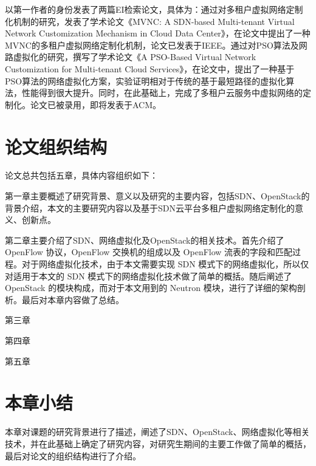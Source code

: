 以第一作者的身份发表了两篇EI检索论文，具体为：通过对多租户虚拟网络定制化机制的研究，发表了学术论文《MVNC: A SDN-based Multi-tenant Virtual Network Customization Mechanism in Cloud Data Center》，在论文中提出了一种MVNC的多租户虚拟网络定制化机制，论文已发表于IEEE。通过对\gls*{PSO}算法及网路虚拟化的研究，撰写了学术论文《A PSO-Based Virtual Network Customization for Multi-tenant Cloud Services》，在论文中，提出了一种基于PSO算法的网络虚拟化方案，实验证明相对于传统的基于最短路径的虚拟化算法，性能得到很大提升。同时，在此基础上，完成了多租户云服务中虚拟网络的定制化。论文已被录用，即将发表于ACM。
\section{论文组织结构}
论文总共包括五章，具体内容组织如下：

第一章主要概述了研究背景、意义以及研究的主要内容，包括SDN、OpenStack的背景介绍，本文的主要研究内容以及基于SDN云平台多租户虚拟网络定制化的意义、创新点。

第二章主要介绍了SDN、网络虚拟化及OpenStack的相关技术。首先介绍了OpenFlow 协议，OpenFlow 交换机的组成以及 OpenFlow 流表的字段和匹配过程。对于网络虚拟化技术，由于本文需要实现 SDN 模式下的网络虚拟化，所以仅对适用于本文的 SDN 模式下的网络虚拟化技术做了简单的概括。随后阐述了 OpenStack 的模块构成，而对于本文用到的 Neutron 模块，进行了详细的架构剖析。最后对本章内容做了总结。

第三章

第四章

第五章

\section{本章小结}
本章对课题的研究背景进行了描述，阐述了SDN、OpenStack、网络虚拟化等相关技术，并在此基础上确定了研究内容，对研究生期间的主要工作做了简单的概括，最后对论文的组织结构进行了介绍。